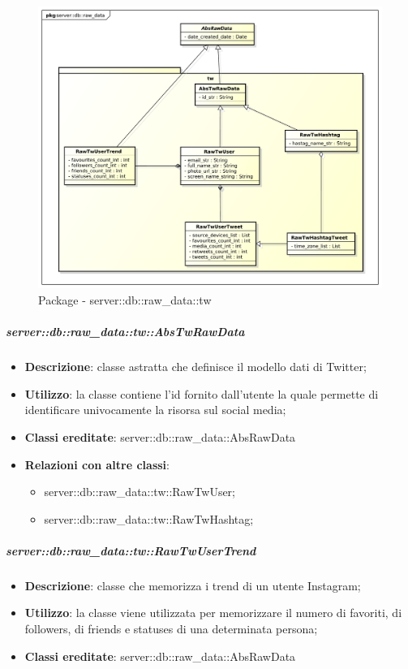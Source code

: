 

		\begin{figure}[htbp]
			\centering
			\centerline{\includegraphics[scale=0.45]{./images/server/raw_data_tw.pdf}}
			\caption{Package - server::db::raw\_data::tw}
		\end{figure}

		
		\subparagraph{server::db::raw\_data::tw::AbsTwRawData} %
		\label{subp:server_db_raw_data_tw_abstwrawdata}
			\begin{itemize}
				\item \textbf{Descrizione}: classe astratta che definisce il modello dati di Twitter;
				\item \textbf{Utilizzo}: la classe contiene l'id fornito dall'utente la quale permette di identificare univocamente la risorsa sul social media;
				\item \textbf{Classi ereditate}: server::db::raw\_data::AbsRawData
				\item \textbf{Relazioni con altre classi}:
					\begin{itemize}
						\item server::db::raw\_data::tw::RawTwUser;
						\item server::db::raw\_data::tw::RawTwHashtag;
					\end{itemize}
			\end{itemize}


		\subparagraph{server::db::raw\_data::tw::RawTwUserTrend} %
		\label{subp:server_db_raw_data_tw_rawigusertrend}
			\begin{itemize}
				\item \textbf{Descrizione}: classe che memorizza i trend di un utente Instagram;
				\item \textbf{Utilizzo}: la classe viene utilizzata per memorizzare il numero di favoriti, di followers, di friends e statuses di una determinata persona;
				\item \textbf{Classi ereditate}: server::db::raw\_data::AbsRawData
			\end{itemize}


